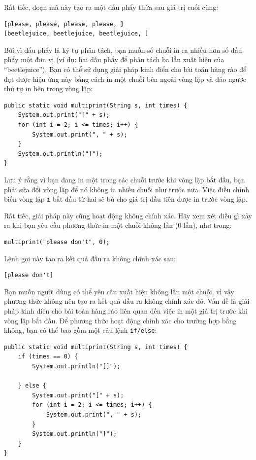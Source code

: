 Rất tiếc, đoạn mã này tạo ra một dấu phẩy thừa sau giá trị cuối cùng:
 
\begin{verbatim}
[please, please, please, please, ] 
[beetlejuice, beetlejuice, beetlejuice, ] 
\end{verbatim}


Bởi vì dấu phẩy là ký tự phân tách, bạn muốn số chuỗi in ra nhiều hơn số dấu phẩy một đơn vị (ví dụ: hai dấu phẩy để phân tách ba lần xuất hiện của ``beetlejuice''). Bạn có thể sử dụng giải pháp kinh điển cho bài toán hàng rào để đạt được hiệu ứng này bằng cách in một chuỗi bên ngoài vòng lặp và đảo ngược thứ tự in bên trong vòng lặp:

\begin{verbatim}
public static void multiprint(String s, int times) {
    System.out.print("[" + s);
    for (int i = 2; i <= times; i++) {
        System.out.print(", " + s);
    }
    System.out.println("]");
}
\end{verbatim}


Lưu ý rằng vì bạn đang in một trong các chuỗi trước khi vòng lặp bắt đầu, bạn phải sửa đổi vòng lặp để nó không in nhiều chuỗi như trước nữa. Việc điều chỉnh biến vòng lặp \texttt{i} bắt đầu từ hai sẽ bù cho giá trị đầu tiên được in trước vòng lặp.

Rất tiếc, giải pháp này cũng hoạt động không chính xác. Hãy xem xét điều gì xảy ra khi bạn yêu cầu phương thức in một chuỗi không lần (0 lần), như trong:

\begin{verbatim}
multiprint("please don't", 0);
\end{verbatim}


Lệnh gọi này tạo ra kết quả đầu ra không chính xác sau:
 
\begin{verbatim}
[please don't] 
\end{verbatim}


Bạn muốn người dùng có thể yêu cầu xuất hiện không lần một chuỗi, vì vậy phương thức không nên tạo ra kết quả đầu ra không chính xác đó. Vấn đề là giải pháp kinh điển cho bài toán hàng rào liên quan đến việc in một giá trị trước khi vòng lặp bắt đầu. Để phương thức hoạt động chính xác cho trường hợp bằng không, bạn có thể bao gồm một câu lệnh \texttt{if/else}:

\begin{verbatim}
public static void multiprint(String s, int times) {
    if (times == 0) {
        System.out.println("[]");

    } else {
        System.out.print("[" + s);
        for (int i = 2; i <= times; i++) {
            System.out.print(", " + s);
        }
        System.out.println("]");
    }
}
\end{verbatim}


